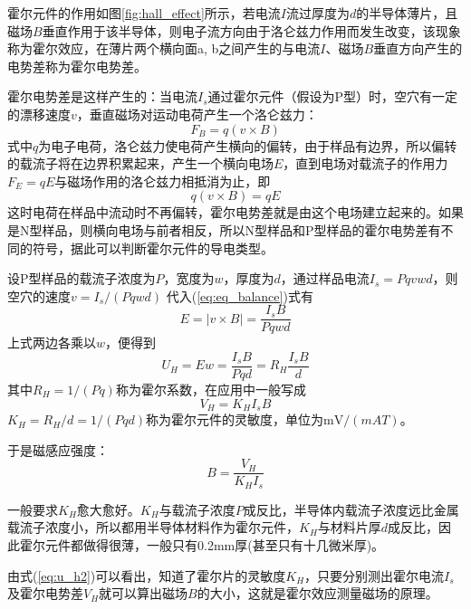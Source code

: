 \documentclass[UTF8]{article}
\begin{document}
	霍尔元件的作用如图\ref{fig:hall_effect}所示，若电流$I$流过厚度为$d$的半导体薄片，且磁场$B$垂直作用于该半导体，则电子流方向由于洛仑兹力作用而发生改变，该现象称为霍尔效应，在薄片两个横向面a, b之间产生的与电流$I$、磁场$B$垂直方向产生的电势差称为霍尔电势差。
	
	霍尔电势差是这样产生的：当电流$I_s$通过霍尔元件（假设为P型）时，空穴有一定的漂移速度${v}$，垂直磁场对运动电荷产生一个洛仑兹力：
	\begin{equation}
		{F}_B = q({v} \times {B})
		\label{eq:f_b}
	\end{equation}
	式中${q}$为电子电荷，洛仑兹力使电荷产生横向的偏转，由于样品有边界，所以偏转的载流子将在边界积累起来，产生一个横向电场${E}$，直到电场对载流子的作用力${F}_E=q{E}$与磁场作用的洛仑兹力相抵消为止，即
	\begin{equation}
		q({v} \times {B}) = q{E}
		\label{eq:eq_balance}
	\end{equation}
	这时电荷在样品中流动时不再偏转，霍尔电势差就是由这个电场建立起来的。如果是N型样品，则横向电场与前者相反，所以N型样品和P型样品的霍尔电势差有不同的符号，据此可以判断霍尔元件的导电类型。
	
	设P型样品的载流子浓度为$P$，宽度为$w$，厚度为$d$，通过样品电流$I_s=P q v w d$，则空穴的速度$v=I_s/(P q w d)$ 代入(\ref{eq:eq_balance})式有
	\begin{equation}
		E = |{v} \times {B}| = \frac{I_s B}{P q w d}
		\label{eq:e_field}
	\end{equation}
	上式两边各乘以$w$，便得到
	\begin{equation}
		U_H = E w = \frac{I_s B}{P q d} = R_H \frac{I_s B}{d}
		\label{eq:u_h1}
	\end{equation}
	其中$R_H=1/(P q)$称为霍尔系数，在应用中一般写成
	\begin{equation}
		V_H = K_H I_s B
		\label{eq:u_h2}
	\end{equation}
	$K_H = R_H / d = 1/(P q d)$称为霍尔元件的灵敏度，单位为$\mathrm{mV}/(m A T)$。
	
	于是磁感应强度：
	\begin{equation}
		B = \frac{V_H}{K_H I_s}
		\label{eq:b_calc}
	\end{equation}
	
	一般要求$K_H$愈大愈好。$K_H$与载流子浓度$P$成反比，半导体内载流子浓度远比金属载流子浓度小，所以都用半导体材料作为霍尔元件，$K_H$与材料片厚$d$成反比，因此霍尔元件都做得很薄，一般只有0.2mm厚(甚至只有十几微米厚)。
	
	由式(\ref{eq:u_h2})可以看出，知道了霍尔片的灵敏度$K_H$，只要分别测出霍尔电流$I_s$及霍尔电势差$V_H$就可以算出磁场$B$的大小，这就是霍尔效应测量磁场的原理。
	
\end{document}
